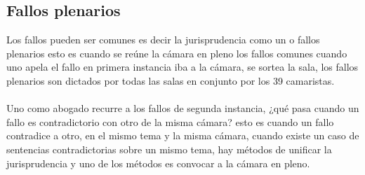 \documentclass[12pt]{book}
\begin{document}
\subsection{Fallos plenarios}
Los fallos pueden ser comunes es decir la jurisprudencia como un o fallos plenarios esto es cuando se reúne la cámara en pleno los fallos comunes cuando uno apela el fallo en primera instancia iba a la cámara, se sortea la sala, los fallos plenarios son dictados por todas las salas en conjunto por los 39 camaristas.
\\
\\
Uno como abogado recurre a los fallos de segunda instancia, ¿qué pasa cuando un fallo es contradictorio con otro de la misma cámara? esto es cuando un fallo contradice a otro, en el mismo tema y la misma c\'amara, cuando existe un caso de sentencias contradictorias sobre un mismo tema, hay métodos de unificar la jurisprudencia y uno de los métodos es convocar a la cámara en pleno.\\
\\
\end{document}
